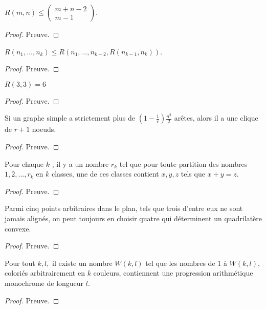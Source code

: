 \begin{mycorr}
  $R(m, n) \leq (
    \begin{array}{c}
      m+n-2 \\
      m-1
    \end{array})$.
  \begin{proof}
     Preuve.
  \end{proof}
\end{mycorr}

\begin{mytheo}
  $R(n_1, ..., n_k) \leq R(n_1, ..., n_{k-2}, R(n_{k-1}, n_k))$.
  \begin{proof}
     Preuve.
  \end{proof}
\end{mytheo}

\begin{mytheo} 
  $R(3, 3) = 6$
  \begin{proof}
     Preuve.
  \end{proof}
\end{mytheo}

\begin{mytheo} 
  Si un graphe simple a strictement plus de $(1 − \frac{1}{r}) \frac{n^2}{2}$ arêtes, alors il a une clique de $r + 1$ noeuds.
  \begin{proof}
     Preuve.
  \end{proof}
\end{mytheo}

\begin{mytheo} 
  Pour chaque $k$ , il y a un nombre $r_k$ tel que pour toute partition des nombres $1, 2, ..., r_k$ en $k$ classes, une de ces classes contient $x, y , z$ tels que $x + y = z$.
  \begin{proof}
     Preuve.
  \end{proof}
\end{mytheo}

\begin{mytheo} 
  Parmi cinq points arbitraires dans le plan, tels que trois d’entre eux ne sont jamais alignés, on peut toujours en choisir quatre qui déterminent un quadrilatère convexe.
  \begin{proof}
     Preuve.
  \end{proof}
\end{mytheo}

\begin{mytheo} 
  Pour tout $k , l,$ il existe un nombre $W (k , l)$ tel que les nombres de $1$ à $W (k , l)$, coloriés arbitrairement en $k$ couleurs, contiennent une progression arithmétique monochrome de longueur $l$.
  \begin{proof}
     Preuve.
  \end{proof}
\end{mytheo}







